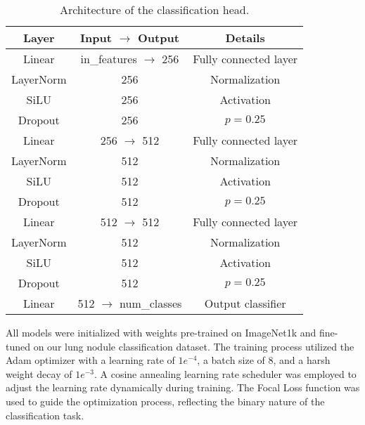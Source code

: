 \begin{table}[h]
    \centering
    \begin{tabular}{|c|c|c|}
    \hline
    \textbf{Layer} & \textbf{Input $\rightarrow$ Output} & \textbf{Details} \\
    \hline
    Linear & in\_features $\rightarrow$ 256 & Fully connected layer \\
    LayerNorm & 256 & Normalization \\
    SiLU & 256 & Activation \\
    Dropout & 256 & $p=0.25$ \\
    \hline
    Linear & 256 $\rightarrow$ 512 & Fully connected layer \\
    LayerNorm & 512 & Normalization \\
    SiLU & 512 & Activation \\
    Dropout & 512 & $p=0.25$ \\
    \hline
    Linear & 512 $\rightarrow$ 512 & Fully connected layer \\
    LayerNorm & 512 & Normalization \\
    SiLU & 512 & Activation \\
    Dropout & 512 & $p=0.25$ \\
    \hline
    Linear & 512 $\rightarrow$ num\_classes & Output classifier \\
    \hline
    \end{tabular}
    \caption{Architecture of the classification head.}
    \label{tab:classification-head}
\end{table}
    
All models were initialized with weights pre-trained on ImageNet1k and fine-tuned on our lung nodule classification dataset. The training process utilized the Adam optimizer \cite{kingma2017adam} with a learning rate of $1e^{-4}$, a batch size of 8, and a harsh weight decay of $1e^{-3}$. A cosine annealing learning rate scheduler was employed to adjust the learning rate dynamically during training. The Focal Loss function was used to guide the optimization process, reflecting the binary nature of the classification task.

